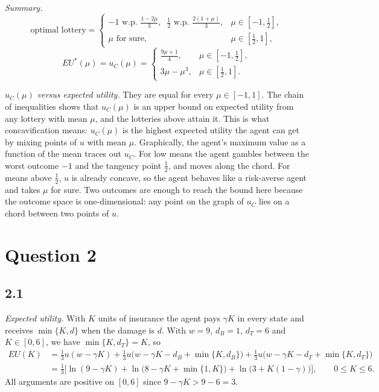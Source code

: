 \documentclass[12pt,letterpaper]{article}
\begin{document}
\textit{Summary.}
\[
\text{optimal lottery}=
\begin{cases}
-1 \text{ w.p. } \tfrac{1-2\mu}{3},\;\; \tfrac12 \text{ w.p. } \tfrac{2(1+\mu)}{3}, & \mu\in[-1,\tfrac12],\\[6pt]
\mu \text{ for sure}, & \mu\in[\tfrac12,1],
\end{cases}
\]
\[
EU^*(\mu)=u_C(\mu)=
\begin{cases}
\tfrac{9\mu+1}{4}, & \mu\in[-1,\tfrac12],\\[4pt]
3\mu-\mu^3, & \mu\in[\tfrac12,1].
\end{cases}
\]

\textit{$u_C(\mu)$ versus expected utility.} They are equal for every $\mu\in[-1,1]$. The chain of inequalities shows that $u_C(\mu)$ is an upper bound on expected utility from any lottery with mean $\mu$, and the lotteries above attain it. This is what concavification means: $u_C(\mu)$ is the highest expected utility the agent can get by mixing points of $u$ with mean $\mu$. Graphically, the agent's maximum value as a function of the mean traces out $u_C$. For low means the agent gambles between the worst outcome $-1$ and the tangency point $\tfrac12$, and moves along the chord. For means above $\tfrac12$, $u$ is already concave, so the agent behaves like a risk-averse agent and takes $\mu$ for sure. Two outcomes are enough to reach the bound here because the outcome space is one-dimensional: any point on the graph of $u_C$ lies on a chord between two points of $u$.

\section*{Question 2}

\subsection*{2.1}

\textit{Expected utility.} With $K$ units of insurance the agent pays $\gamma K$ in every state and receives $\min\{K,d\}$ when the damage is $d$. With $w=9$, $d_B=1$, $d_T=6$ and $K\in[0,6]$, we have $\min\{K,d_T\}=K$, so
\[
\begin{aligned}
EU(K)&=\tfrac13 u(w-\gamma K)+\tfrac13 u\big(w-\gamma K-d_B+\min\{K,d_B\}\big)+\tfrac13 u\big(w-\gamma K-d_T+\min\{K,d_T\}\big)\\[2pt]
&=\tfrac13\Big[\ln(9-\gamma K)+\ln\big(8-\gamma K+\min\{1,K\}\big)+\ln\big(3+K(1-\gamma)\big)\Big],\qquad 0\le K\le 6 .
\end{aligned}
\]
All arguments are positive on $[0,6]$ since $9-\gamma K>9-6=3$.
\end{document}
